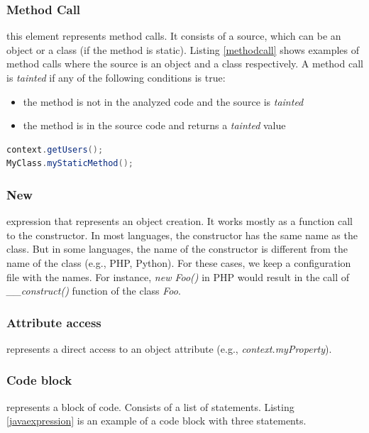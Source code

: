 \subsubsection{Method Call} this element represents method calls. It consists of a source, which can be an object or a class (if the method is static). Listing \ref{methodcall} shows examples of method calls where the source is an object and a class respectively. A method call is \textit{tainted} if any of the following conditions is true:

\begin{itemize}
    \item the method is not in the analyzed code and the source is \textit{tainted}
    \item the method is in the source code and returns a \textit{tainted} value
\end{itemize}

\begin{lstlisting}[language=Java,
    showstringspaces=false,
    caption={Method call examples},
    label=methodcall]
context.getUsers();
MyClass.myStaticMethod();
\end{lstlisting}


\subsubsection{New} expression that represents an object creation. It works mostly as a function call to the constructor. In most languages, the constructor has the same name as the class. But in some languages, the name of the constructor is different from the name of the class (e.g., PHP, Python). For these cases, we keep a configuration file with the names. For instance, \textit{new Foo()} in PHP would result in the call of \textit{\_\_construct()} function of the class \textit{Foo}.

\subsubsection{Attribute access} represents a direct access to an object attribute (e.g., \textit{context.myProperty}).


\subsubsection{Code block} represents a block of code. Consists of a list of statements. Listing \ref{javaexpression} is an example of a code block with three statements.

